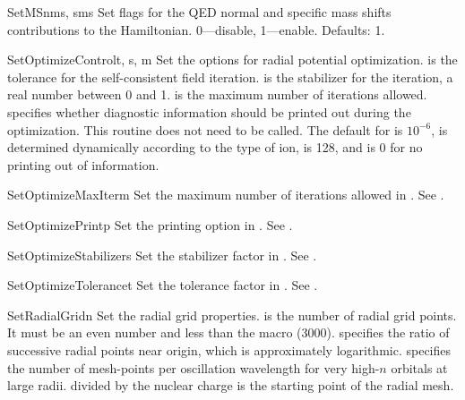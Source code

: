 \begin{fundesc}{SetMS}{nms, sms}
Set flags for the QED normal and specific mass shifts contributions to the
Hamiltonian. 0---disable, 1---enable. Defaults: 1.
\end{fundesc}

\begin{fundesc}{SetOptimizeControl}{t, s, m}
Set the options for radial potential optimization.  is the tolerance for
the self-consistent field iteration.  is the stabilizer for the
iteration, a real number between 0 and 1.  is the maximum number of
iterations allowed.   specifies whether diagnostic information should be
printed out during the optimization. This routine does not need to be called.
The default for  is $10^{-6}$,  is determined dynamically
according to the type of ion,  is 128, and  is 0 for no printing
out of information.
\end{fundesc}

\begin{fundesc}{SetOptimizeMaxIter}{m}
Set the maximum number of iterations allowed in . See
.
\end{fundesc}

\begin{fundesc}{SetOptimizePrint}{p}
Set the printing option in . See
.
\end{fundesc}

\begin{fundesc}{SetOptimizeStabilizer}{s}
Set the stabilizer factor in . See
.
\end{fundesc}

\begin{fundesc}{SetOptimizeTolerance}{t}
Set the tolerance factor in . See
.
\end{fundesc}

\begin{fundesc}{SetRadialGrid}{n}
Set the radial grid properties.  is the number of radial grid points. It
must be an even number and less than the macro  (3000). 
specifies the ratio of successive radial points near  origin, which is
approximately logarithmic.  specifies the number of mesh-points per
oscillation wavelength for very high-$n$ orbitals at large  radii. 
divided by the nuclear charge is the starting point of the radial mesh.
\end{fundesc}

